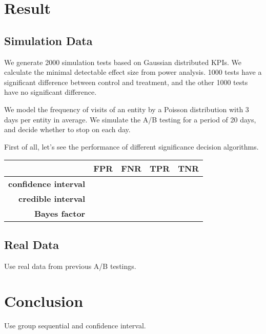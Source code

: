 \documentclass[paper=a4, fontsize=11pt]{scrartcl} %
\numberwithin{equation}{section} %
\numberwithin{figure}{section} %
\numberwithin{table}{section} %
\begin{document}
\section{Result}

\subsection{Simulation Data}
We generate 2000 simulation tests based on Gaussian distributed KPIs. We calculate the minimal detectable effect size from power analysis. 1000 tests have a significant difference between control and treatment, and the other 1000 tests have no significant difference. 

We model the frequency of visits of an entity by a Poisson distribution with 3 days per entity in average. We simulate the A/B testing for a period of 20 days, and decide whether to stop on each day.

First of all, let's see the performance of different significance decision algorithms.
\begin{center}
  \begin{tabular}{ | r | c | c | c | c | }
    \hline
    & FPR & FNR & TPR & TNR\\ \hline
    \textbf{confidence interval} &  &   &  & \\ \hline
    \textbf{credible interval} &  &  &  & \\ \hline
    \textbf{Bayes factor} &  &  & & \\
    \hline
  \end{tabular}
\end{center}


\subsection{Real Data}
Use real data from previous A/B testings.

\section{Conclusion}
Use group sequential and confidence interval.

\end{document}
